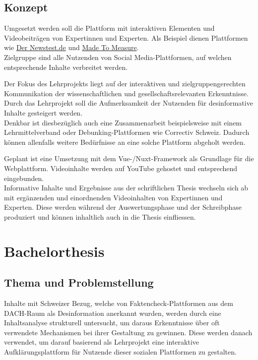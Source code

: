 \documentclass[12pt,a4paper]{article}        %
\begin{document}
\subsection{Konzept}
Umgesetzt werden soll die Plattform mit interaktiven Elementen und Videobeiträgen von Expertinnen und Experten. Als Beispiel dienen Plattformen wie \href{https://www.der-newstest.de}{Der Newstest.de} und \href{https://madetomeasure.online/de/}{Made To Measure}.\\
Zielgruppe sind alle Nutzenden von Social Media-Plattformen, auf welchen entsprechende Inhalte verbreitet werden.

Der Fokus des Lehrprojekts liegt auf der interaktiven und zielgruppengerechten Kommunikation der wissenschaftlichen und gesellschaftsrelevanten Erkenntnisse. Durch das Lehrprojekt soll die Aufmerksamkeit der Nutzenden für desinformative Inhalte gesteigert werden. \\
Denkbar ist diesbezüglich auch eine Zusammenarbeit beispielsweise mit einem Lehrmittelverband oder Debunking-Plattformen wie Correctiv Schweiz. Dadurch können allenfalls weitere Bedürfnisse an eine solche Plattform abgeholt werden.

Geplant ist eine Umsetzung mit dem Vue-/Nuxt-Framework als Grundlage für die Webplattform. Videoinhalte werden auf YouTube gehostet und entsprechend eingebunden.\\
Informative Inhalte und Ergebnisse aus der schriftlichen Thesis wechseln sich ab mit ergänzenden und einordnenden Videoinhalten von Expertinnen und Experten. Diese werden während der Auswertungsphase und der Schreibphase produziert und können inhaltlich auch in die Thesis einfliessen.

\section{Bachelorthesis}
\subsection{Thema und Problemstellung}
Inhalte mit Schweizer Bezug, welche von Faktencheck-Plattformen aus dem DACH-Raum als Desinformation anerkannt wurden, werden durch eine Inhaltsanalyse strukturell untersucht, um daraus Erkenntnisse über oft verwendete Mechanismen bei ihrer Gestaltung zu gewinnen. Diese werden danach verwendet, um darauf basierend als Lehrprojekt eine interaktive Aufklärungsplattform für Nutzende dieser sozialen Plattformen zu gestalten.
\end{document}
